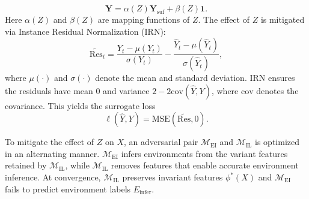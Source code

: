 ﻿\documentclass[journal]{IEEEtran}
\begin{document}
\begin{equation}
\mathbf{Y}=\alpha(Z)\mathbf{Y}_{\mathrm{suf}}+\beta(Z) \mathbf{1}.
\end{equation}
Here $\alpha(Z)$ and $\beta(Z)$ are mapping functions of $Z$. The effect of $Z$ is mitigated via Instance Residual Normalization (IRN):
\begin{equation}
\tilde{\mathrm{Res}}_t=\frac{Y_t-\mu(Y_t)}{\sigma(Y_t)}-\frac{\widehat{Y}_t-\mu(\widehat{Y}_t)}{\sigma(\widehat{Y}_t)},
\end{equation}
where $\mu(\cdot)$ and $\sigma(\cdot)$ denote the mean and standard deviation. IRN ensures the residuals have mean 0 and variance $2-2\mathrm{cov}(\widehat{Y},Y)$, where $\mathrm{cov}$ denotes the covariance. This yields the surrogate loss
\begin{equation}
\ell(\widehat{Y},Y)=\mathrm{MSE}(\tilde{\mathrm{Res}},0).
\end{equation}

To mitigate the effect of $Z$ on $X$, an adversarial pair $\mathcal{M}_{\mathrm{EI}}$ and $\mathcal{M}_{\mathrm{IL}}$ is optimized in an alternating manner. $\mathcal{M}_{\mathrm{EI}}$ infers environments from the variant features retained by $\mathcal{M}_{\mathrm{IL}}$, while $\mathcal{M}_{\mathrm{IL}}$ removes features that enable accurate environment inference. At convergence, $\mathcal{M}_{\mathrm{IL}}$ preserves invariant features $\phi^{*}(X)$ and $\mathcal{M}_{\mathrm{EI}}$ fails to predict environment labels $E_{\mathrm{infer}}$. 
\end{document}
